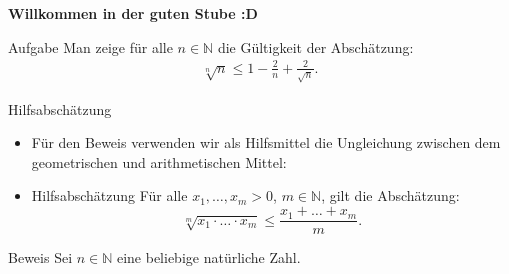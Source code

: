 \documentclass[10pt]{beamer}
\title{}
\author{Artur's Mathematikstübchen}
\date{}
\def\bN{\mathbb{N}}
\begin{document}

\begin{frame}
    \begin{center}
        \textbf{\huge Willkommen in der guten Stube \newline \newline :D}
    \end{center}
\end{frame}




\begin{frame}{}
    \begin{alertblock}{Aufgabe}
        Man zeige für alle \( n \in \bN \) die Gültigkeit der Abschätzung:
        \begin{align*}
            \sqrt[n]{n}
        	\leq 1 - \frac{2}{n} + \frac{2}{\sqrt{n}}.
        \end{align*}
    \end{alertblock}
\end{frame}



\begin{frame}{Hilfsabschätzung}
    \begin{itemize}
        \item<1->  Für den Beweis verwenden wir als Hilfsmittel die Ungleichung zwischen dem geometrischen und arithmetischen Mittel:   
        \item<2-> 
        \begin{block}{Hilfsabschätzung}
             Für alle \( x_{1}, \ldots, x_{m} > 0 \), \( m \in \bN \), gilt die Abschätzung:
             \[
                \sqrt[m]{x_{1} \cdot \ldots \cdot x_{m}} 
                \leq \frac{x_{1} + \ldots + x_{m}}{m}.
             \]
        \end{block} 
    \end{itemize}
\end{frame}



\begin{frame}{Beweis}
    Sei \( n \in \bN \) eine beliebige natürliche Zahl.
\end{frame}



\end{document}
